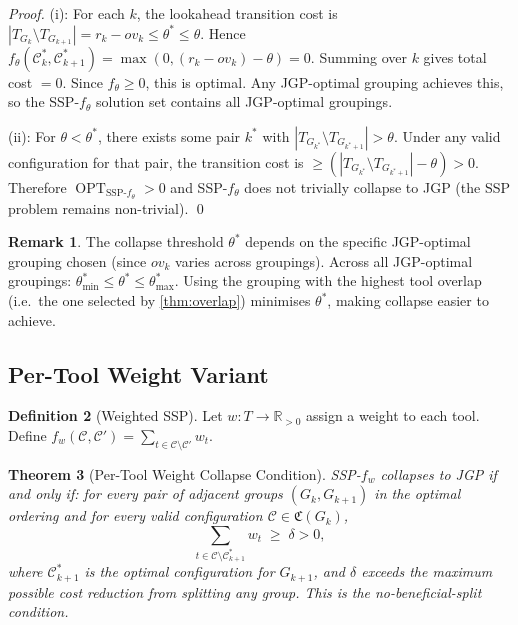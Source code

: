 \documentclass[11pt,a4paper]{article}
\theoremstyle{plain}
\newtheorem{theorem}{Theorem}[section]
\theoremstyle{definition}
\newtheorem{definition}[theorem]{Definition}
\newtheorem{remark}[theorem]{Remark}
\DeclareMathOperator{\OPT}{OPT}
\newcommand{\Cconf}{\mathfrak{C}}   %
\begin{document}
\begin{proof}
(i): For each $k$, the lookahead transition cost is $|T_{G_k} \setminus T_{G_{k+1}}| = r_k - \mathit{ov}_k \le \theta^* \le \theta$. Hence $f_\theta(\mathcal{C}_k^*, \mathcal{C}_{k+1}^*) = \max(0, (r_k - \mathit{ov}_k) - \theta) = 0$. Summing over $k$ gives total cost $= 0$. Since $f_\theta \ge 0$, this is optimal. Any JGP-optimal grouping achieves this, so the SSP-$f_\theta$ solution set contains all JGP-optimal groupings.

(ii): For $\theta < \theta^*$, there exists some pair $k^*$ with
$|T_{G_{k^*}} \setminus T_{G_{k^*+1}}| > \theta$. Under any valid configuration for
that pair, the transition cost is $\ge (|T_{G_{k^*}} \setminus T_{G_{k^*+1}}| - \theta) > 0$.
Therefore $\OPT_{\mathrm{SSP}\text{-}f_\theta} > 0$ and SSP-$f_\theta$ does not trivially
collapse to JGP (the SSP problem remains non-trivial). \qed
\end{proof}

\begin{remark}
The collapse threshold $\theta^*$ depends on the specific JGP-optimal grouping chosen
(since $\mathit{ov}_k$ varies across groupings). Across all JGP-optimal groupings:
$\theta^*_{\min} \le \theta^* \le \theta^*_{\max}$.
Using the grouping with the highest tool overlap (i.e.\ the one selected by \cref{thm:overlap})
minimises $\theta^*$, making collapse easier to achieve.
\end{remark}

\subsection{Per-Tool Weight Variant}
\label{sec:pertool}

\begin{definition}[Weighted SSP]
Let $w: T \to \mathbb{R}_{>0}$ assign a weight to each tool.
Define $f_w(\mathcal{C}, \mathcal{C}') = \sum_{t \in \mathcal{C} \setminus \mathcal{C}'} w_t$.
\end{definition}

\begin{thmbox}
\begin{theorem}[Per-Tool Weight Collapse Condition]
\label{thm:pertool}
SSP-$f_w$ collapses to JGP if and only if:
for every pair of adjacent groups $(G_k, G_{k+1})$ in the optimal ordering and for
every valid configuration $\mathcal{C} \in \Cconf(G_k)$,
\[
  \sum_{t \in \mathcal{C} \setminus \mathcal{C}_{k+1}^*} w_t \;\ge\; \delta > 0,
\]
where $\mathcal{C}_{k+1}^*$ is the optimal configuration for $G_{k+1}$,
and $\delta$ exceeds the maximum possible cost reduction from splitting any group.
This is the \emph{no-beneficial-split} condition.
\end{theorem}
\end{thmbox}
\end{document}
